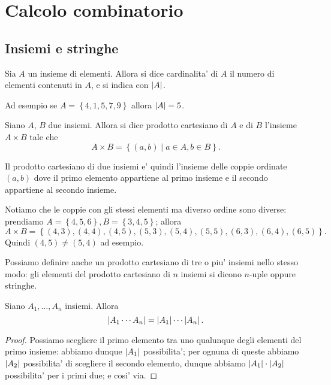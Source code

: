 \chapter{Calcolo combinatorio}

\section{Insiemi e stringhe}

\begin{definition}
    Sia $A$ un insieme di elementi. Allora si dice cardinalita' di $A$ il numero di elementi contenuti in $A$, e si indica con $\left|A\right|$.
\end{definition}
Ad esempio se $A = \left\{ 4, 1, 5, 7, 9\right\}$ allora $\left|A\right| = 5$.

\begin{definition}
    Siano $A$, $B$ due insiemi. Allora si dice prodotto cartesiano di $A$ e di $B$ l'insieme $A \times B$ tale che \[
        A \times B = \left\{ (a, b) \mid a \in A, b \in B\right\}   
    .\]
\end{definition}
Il prodotto cartesiano di due insiemi e' quindi l'insieme delle coppie ordinate $(a, b)$ dove il primo elemento appartiene al primo insieme e il secondo appartiene al secondo insieme. 

Notiamo che le coppie con gli stessi elementi ma diverso ordine sono diverse: prendiamo $A = \left\{ 4, 5, 6 \right\}, B = \left\{ 3, 4, 5 \right\}$; allora \[
    A \times B = \left\{ (4, 3), (4, 4), (4, 5), (5, 3), (5, 4), (5, 5), (6, 3), (6, 4), (6, 5)\right\}   
.\] Quindi $(4, 5) \neq (5, 4)$ ad esempio.

Possiamo definire anche un prodotto cartesiano di tre o piu' insiemi nello stesso modo: gli elementi del prodotto cartesiano di $n$ insiemi si dicono $n$-uple oppure stringhe.

\begin{proposition}
    Siano $A_1, \dots, A_n$ insiemi. Allora \begin{equation}
        \left|A_1 \cdots A_n\right| = \left|A_1\right| \cdots \left|A_n\right|.
    \end{equation}
\end{proposition}
\begin{proof}
    Possiamo scegliere il primo elemento tra uno qualunque degli elementi del primo insieme: abbiamo dunque $\left|A_1\right|$ possibilita'; per ognuna di queste abbiamo $\left|A_2\right|$ possibilita' di scegliere il secondo elemento, dunque abbiamo $\left|A_1\right| \cdot \left|A_2\right|$ possibilita' per i primi due; e cosi' via.
\end{proof}

